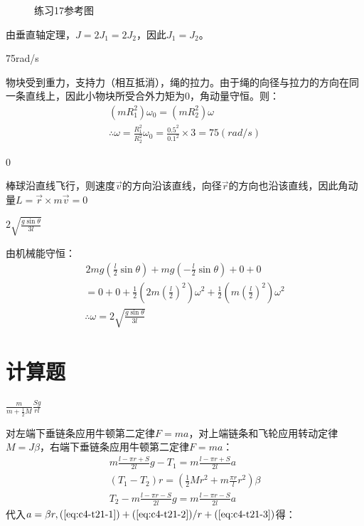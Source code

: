 \documentclass[b5paper,opensource,sourcefont,parskip]{qyxf-book}
\begin{document}
\begin{figure}[htbp]
\centering
{}
\caption{练习17参考图}\label{fig:c4-t17}
\end{figure}

由垂直轴定理，$ J=2J_1=2J_2 $，因此$ J_1=J_2 $。

75rad/s

\solve 物块受到重力，支持力（相互抵消），绳的拉力。由于绳的向径与拉力的方向在同一条直线上，因此小物块所受合外力矩为0，角动量守恒。则：
\begin{gather*}
(mR_1^2)\omega_0=(mR_2^2)\omega\\
\therefore \omega=\frac{R_1^2}{R_2^2}\omega_0=\frac{0.5^2}{0.1^2}\times 3=75(rad/s)
\end{gather*}

0

\solve 棒球沿直线飞行，则速度$ \vec{v} $的方向沿该直线，向径$ \vec{r} $的方向也沿该直线，因此角动量$ L=\vec{r}\times m\vec{v}=0 $

$2\sqrt{\frac{g\sin\theta}{3l}}$

\solve 由机械能守恒：
\begin{gather*}
\hspace{1pt}2mg\left(\frac{l}{2}\sin\theta\right)+mg\left(-\frac{l}{2}\sin\theta\right)+0+0\\
=0+0+\frac{1}{2}\left(2m\left(\frac{l}{2}\right)^2\right)\omega^2+\frac{1}{2}\left(m\left(\frac{l}{2}\right)^2\right)\omega^2\\
\therefore \omega=2\sqrt{\frac{g\sin\theta}{3l}}
\end{gather*}

\section{计算题}

$\frac{m}{m+\frac{1}{2}M}\frac{Sg}{rl}$
			
\solve 对左端下垂链条应用牛顿第二定律$F=ma$，对上端链条和飞轮应用转动定律$M=J\beta$，右端下垂链条应用牛顿第二定律$F=ma$：
\begin{gather}
m\frac{l-\pi r+S}{2l}g-T_1=m\frac{l-\pi r+S}{2l}a\label{eq:c4-t21-1}\\
(T_1-T_2)r=\left(\frac{1}{2}Mr^2+m\frac{\pi r}{l}r^2\right)\beta\label{eq:c4-t21-2}\\
T_2-m\frac{l-\pi r-S}{2l}g=m\frac{l-\pi r-S}{2l}a\label{eq:c4-t21-3}
\end{gather}
代入$a=\beta r,(\ref{eq:c4-t21-1})+(\ref{eq:c4-t21-2})/r+(\ref{eq:c4-t21-3})$得：
\end{document}
